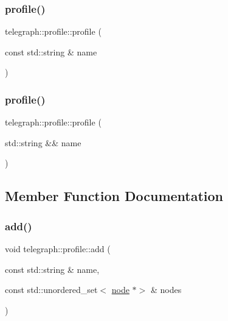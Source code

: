 \subsubsection{\texorpdfstring{profile()}{profile()}\hspace{0.1cm}{\footnotesize\ttfamily [1/2]}}
{\footnotesize\ttfamily telegraph\+::profile\+::profile (\begin{DoxyParamCaption}\item[{const std\+::string \&}]{name }\end{DoxyParamCaption})\hspace{0.3cm}{\ttfamily [inline]}}

\mbox{\label{classtelegraph_1_1profile_adfe111d01fccdfad856ff27abf5c9959}} 
\subsubsection{\texorpdfstring{profile()}{profile()}\hspace{0.1cm}{\footnotesize\ttfamily [2/2]}}
{\footnotesize\ttfamily telegraph\+::profile\+::profile (\begin{DoxyParamCaption}\item[{std\+::string \&\&}]{name }\end{DoxyParamCaption})\hspace{0.3cm}{\ttfamily [inline]}}



\subsection{Member Function Documentation}
\mbox{\label{classtelegraph_1_1profile_ad3b7efc2c78486ded407d9f7d77c63ad}} 
\subsubsection{\texorpdfstring{add()}{add()}\hspace{0.1cm}{\footnotesize\ttfamily [1/2]}}
{\footnotesize\ttfamily void telegraph\+::profile\+::add (\begin{DoxyParamCaption}\item[{const std\+::string \&}]{name,  }\item[{const std\+::unordered\+\_\+set$<$ \hyperlink{classtelegraph_1_1node}{node} $\ast$$>$ \&}]{nodes }\end{DoxyParamCaption})\hspace{0.3cm}{\ttfamily [inline]}}

